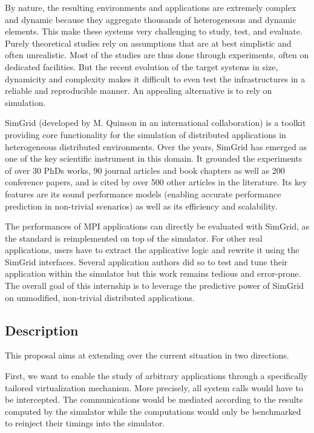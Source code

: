 \documentclass[a4paper,11pt]{article}
\begin{document}
By nature, the resulting environments and applications are extremely
complex and dynamic because they aggregate thousands of heterogeneous
and dynamic elements. This make these systems very challenging to
study, test, and evaluate.  Purely theoretical studies rely on
assumptions that are at best simplistic and often unrealistic. Most of
the studies are thus done through experiments, often on dedicated
facilities.
%
But the recent evolution of the target systems in size, dynamicity and
complexity makes it difficult to even test the infrastructures in a
reliable and reproducible manner. An appealing alternative is to rely
on simulation.


SimGrid (developed by M. Quinson in an international collaboration) is
a toolkit providing core functionality for the simulation of
distributed applications in heterogeneous distributed environments.
Over the years, SimGrid has emerged as one of the key scientific
instrument in this domain. It grounded the experiments of over 30 PhDs
works, 90 journal articles and book chapters as well as 200 conference
papers, and is cited by over 500 other articles in the literature. Its
key features are its sound performance models (enabling accurate
performance prediction in non-trivial scenarios) as well as its
efficiency and scalability.

The performances of MPI applications can directly be evaluated with
SimGrid, as the standard is reimplemented on top of the simulator. For
other real applications, users have to extract the applicative logic
and rewrite it using the SimGrid interfaces. Several application
authors did so to test and tune their application within the simulator
but this work remains tedious and error-prone. The overall goal of
this internship is to leverage the predictive power of SimGrid on
unmodified, non-trivial distributed applications.

\subsection*{Description}
This proposal aims at extending over the current situation in two
directions. 

First, we want to enable the study of arbitrary applications through a
specifically tailored virtualization mechanism. More precisely, all
system calls would have to be intercepted.  The communications would
be mediated according to the results computed by the simulator while
the computations would only be benchmarked to reinject their timings
into the simulator. 
\end{document}
